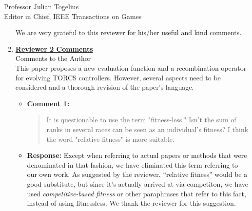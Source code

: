 \documentclass[10pt]{letter} %
\begin{document}
\begin{letter}{Professor Julian Togelius \\ Editor in Chief, IEEE Transactions on Games}
\begin{enumerate}
We are very grateful to this reviewer for his/her useful and kind comments.

\newpage


\item {\bf \underline{ Reviewer 2 Comments}}\\
	Comments to the Author\\
This paper proposes a new evaluation function and a recombination operator for evolving TORCS controllers. However, several aspects need to be considered and a thorough revision of the paper's language.

	\begin{itemize}			

		\item {\bf Comment 1:}
		\begin{quote}
	It is questionable to use the term "fitness-less." Isn't the sum of ranks in several races can be seen as an individual's fitness? I think the word "relative-fitness" is more suitable.
		\end{quote}	
		\item {\bf Response:} Except when referring to actual
                  papers or methods that were denominated in that
                  fashion, we have eliminated this term referring to
                  our own work. As suggested by the reviewer,
                  ``relative fitness'' would be a good substitute, but
                  since it's actually arrived at via competiton, we
                  have used {\em competitive-based fitness} or other
                  paraphrases that refer to this fact, instead of
                  using fitnessless. We thank the reviewer for this suggestion.


\end{itemize}
\end{enumerate}
\end{letter}
\end{document}
